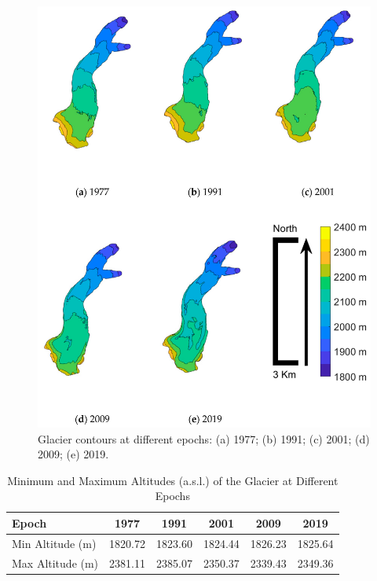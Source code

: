 \begin{figure}[h!]
    \centering
    \includegraphics[height=0.90\textheight]{results_contours.png}
    \caption{Glacier contours at different epochs: (a) 1977; (b) 1991; (c) 2001; (d) 2009; (e) 2019.}
    \label{fig:2:results_contour}
\end{figure}

\begin{table}[ht]
  \centering
  \caption{Minimum and Maximum Altitudes (a.s.l.) of the Glacier at Different Epochs}
  \label{tab:2:glacier_altitudes}
  \begin{tabular}{lccccc}
    \hline
    Epoch & 1977 & 1991 & 2001 & 2009 & 2019 \\
    \hline
    Min Altitude (m) & 1820.72 & 1823.60 & 1824.44 & 1826.23 & 1825.64 \\
    Max Altitude (m) & 2381.11 & 2385.07 & 2350.37 & 2339.43 & 2349.36 \\
    \hline
  \end{tabular}
\end{table}

